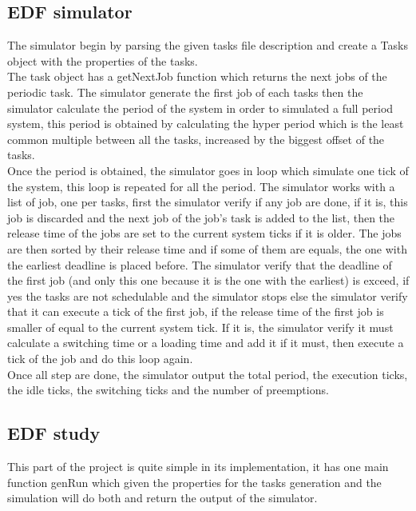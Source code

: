 \documentclass[a4paper,12pt]{article}
\begin{document}
\subsection{EDF simulator}
The simulator begin by parsing the given tasks file description and create a Tasks object with the properties of the tasks.\\
The task object has a getNextJob function which returns the next jobs of the periodic task. The simulator generate the first job of each tasks then the simulator calculate the period of the system in order to simulated a full period system, this period is obtained by calculating the hyper period which is the least common multiple between all the tasks, increased by the biggest offset of the tasks.\\
Once the period is obtained, the simulator goes in loop which simulate one tick of the system, this loop is repeated for all the period. The simulator works with a list of job, one per tasks, first the simulator verify if any job are done, if it is, this job is discarded and the next job of the job's task is added to the list, then the release time of the jobs are set to the current system ticks if it is older. The jobs are then sorted by their release time and if some of them are equals, the one with the earliest deadline is placed before. The simulator verify that the deadline of the first job (and only this one because it is the one with the earliest) is exceed, if yes the tasks are not schedulable and the simulator stops else the simulator verify that it can execute a tick of the first job, if the release time of the first job is smaller of equal to the current system tick. If it is, the simulator verify it must calculate a switching time or a loading time and add it if it must, then execute a tick of the job and do this loop again.\\
Once all step are done, the simulator output the total period, the execution ticks, the idle ticks, the switching ticks and the number of preemptions.

\subsection{EDF study}
This part of the project is quite simple in its implementation, it has one main function genRun which given the properties for the tasks generation and the simulation will do both and return the output of the simulator.
\end{document}
